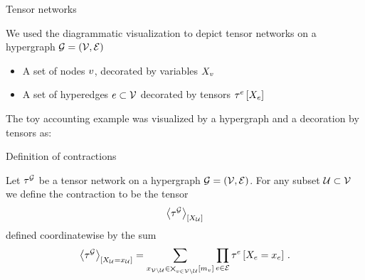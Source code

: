 \documentclass{beamer}
\begin{document}
    \begin{frame}{Tensor networks}

        We used the diagrammatic visualization to depict tensor networks on a hypergraph $\mathcal{G}=(\mathcal{V},\mathcal{E})$
        \begin{itemize}
            \item A set of nodes $v$, decorated by variables $X_{v}$
            \item A set of hyperedges $e\subset\mathcal{V}$ decorated by tensors $\tau^{e}\left[X_{e}\right]$
        \end{itemize}
        The toy accounting example was visualized by a hypergraph and a decoration by tensors as:


    \end{frame}

    \begin{frame}{Definition of contractions}
        \begin{definition}[Contraction]
            Let $\tau^{\mathcal{G}}$ be a tensor network on a hypergraph $\mathcal{G}=(\mathcal{V},\mathcal{E})$.
            For any subset $\mathcal{U}\subset\mathcal{V}$ we define the contraction to be the tensor
            \begin{align*}
                \left\langle \tau^{\mathcal{G}}\right\rangle_{\left[ X_{\mathcal{U}} \right]}
            \end{align*}
            defined coordinatewise by the sum
            \begin{align*}
                \left\langle \tau^{\mathcal{G}}\right\rangle_{\left[ X_{\mathcal{U}}=x_{\mathcal{U}} \right]} =
                \sum_{x_{\mathcal{V}\backslash\mathcal{U}}\in\bigtimes_{v\in\mathcal{V}\backslash\mathcal{U}}[m_{v}]}
                \prod_{e\in\mathcal{E}}\tau^{e}\left[X_{e}=x_{e}\right] \, .
            \end{align*}
        \end{definition}
    \end{frame}
\end{document}

